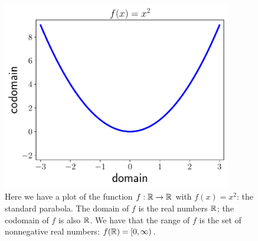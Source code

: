\begin{figure}[t]
\centering
    \includegraphics[width=10cm]{plots/parabola/function_parabola.pdf}
    \caption[Plot of a parabola]{Here
        we have a plot of the \gls{function} $f:\mathbb{R}\to\mathbb{R}$ with $f(x) = x^{2}$:
        the standard parabola.
        The domain of $f$ is the real numbers $\mathbb{R}$;
        the codomain of $f$ is also $\mathbb{R}$.
        We have that the range of $f$ is the \gls{set} of nonnegative
        real numbers: $f(\mathbb{R}) = [0,\infty)$.
        }
    \label{fig:parabola_plot}
\end{figure}
